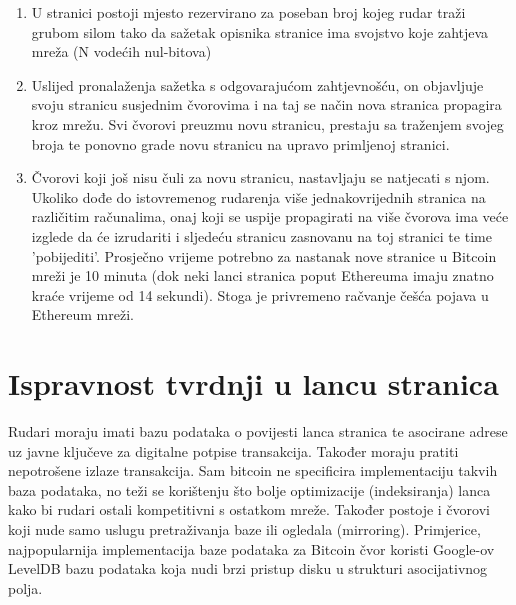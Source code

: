 \documentclass[utf8, zavrsni]{fer}
\begin{document}
\begin{enumerate}
	\item U stranici postoji mjesto rezervirano za poseban broj kojeg rudar traži grubom silom tako da sažetak opisnika stranice ima svojstvo koje zahtjeva mreža (N vodećih nul-bitova)\footnotemark
	\item Uslijed pronalaženja sažetka s odgovarajućom zahtjevnošću, on objavljuje svoju stranicu susjednim čvorovima i na taj se način nova stranica propagira kroz mrežu. Svi čvorovi preuzmu novu stranicu, prestaju sa traženjem svojeg broja te ponovno grade novu stranicu na upravo primljenoj stranici.
	\item Čvorovi koji još nisu čuli za novu stranicu, nastavljaju se natjecati s njom. Ukoliko dođe do istovremenog rudarenja više jednakovrijednih stranica na različitim računalima, onaj koji se uspije propagirati na više čvorova ima veće izglede da će izrudariti i sljedeću stranicu zasnovanu na toj stranici te time 'pobijediti'\footnotemark \footnotemark. Prosječno vrijeme potrebno za nastanak nove stranice u Bitcoin mreži je 10 minuta (dok neki lanci stranica poput Ethereuma imaju znatno kraće vrijeme od 14 sekundi). Stoga je privremeno račvanje češća pojava u Ethereum mreži.
\end{enumerate}

\section{Ispravnost tvrdnji u lancu stranica}
Rudari moraju imati bazu podataka o povijesti lanca stranica te asocirane adrese uz javne ključeve za digitalne potpise transakcija\footnotemark. Također moraju pratiti nepotrošene izlaze transakcija. Sam bitcoin ne specificira implementaciju takvih baza podataka, no teži se korištenju što bolje optimizacije (indeksiranja) lanca kako bi rudari ostali kompetitivni s ostatkom mreže. Također postoje i čvorovi koji nude samo uslugu pretraživanja baze ili ogledala (mirroring). Primjerice, najpopularnija implementacija baze podataka za Bitcoin čvor koristi Google-ov LevelDB bazu podataka koja nudi brzi pristup disku u strukturi asocijativnog polja.
\end{document}
